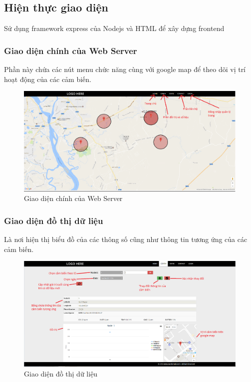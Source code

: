 \subsection{Hiện thực giao diện}

Sử dụng framework express của Nodejs và HTML để xây dựng frontend

\subsubsection*{Giao diện chính của Web Server}
Phần này chứa các nút menu chức năng cùng với google map để theo dõi vị trí hoạt động của các cảm biến.
\begin{center}
	\begin{figure}[H]
		\centering    
		\includegraphics[width=1\textwidth]{webserver}
		\caption[Giao diện chính của Web Server]{Giao diện chính của Web Server}
		\label{fig:webserver}
	\end{figure}
\end{center}

\subsubsection*{Giao diện đồ thị dữ liệu}
Là nơi hiện thị biểu đồ của các thông số cũng như thông tin tương ứng của các cảm biến.
\begin{center}
	\begin{figure}[H]
		\centering    
		\includegraphics[width=1\textwidth]{web_graph}
		\caption[Giao diện đồ thị dữ liệu]{Giao diện đồ thị dữ liệu}
		\label{fig:web_graph}
	\end{figure}
\end{center}



